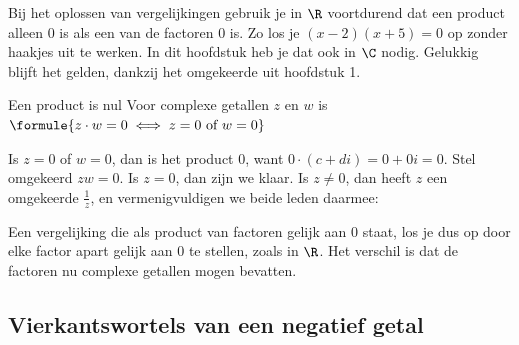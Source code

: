 Bij het oplossen van vergelijkingen gebruik je in $\R$ voortdurend dat een product alleen 0 is als een van de factoren 0 is. Zo los je $(x - 2)(x + 5) = 0$ op zonder haakjes uit te werken. In dit hoofdstuk heb je dat ook in $\C$ nodig. Gelukkig blijft het gelden, dankzij het omgekeerde uit hoofdstuk 1.

\begin{theorie}
\begin{stelling}{Een product is nul}
Voor complexe getallen $z$ en $w$ is \quad $\formule{z \cdot w = 0 \iff z = 0 \text{ of } w = 0}$
\end{stelling}

\begin{bewijs}
Is $z = 0$ of $w = 0$, dan is het product 0, want $0 \cdot (c + di) = 0 + 0i = 0$. Stel omgekeerd $zw = 0$. Is $z = 0$, dan zijn we klaar. Is $z \neq 0$, dan heeft $z$ een omgekeerde $\frac{1}{z}$, en vermenigvuldigen we beide leden daarmee:
\end{bewijs}
\end{theorie}

Een vergelijking die als product van factoren gelijk aan 0 staat, los je dus op door elke factor apart gelijk aan 0 te stellen, zoals in $\R$. Het verschil is dat de factoren nu complexe getallen mogen bevatten.


\begin{oefeningen}
\end{oefeningen}

\subsection{Vierkantswortels van een negatief getal}

